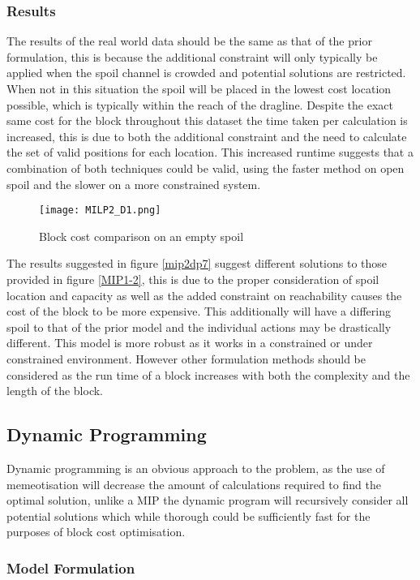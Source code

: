 \subsubsection{Results}
The results of the real world data should be the same as that of the prior formulation, this is because the additional constraint will only typically be applied when the spoil channel is crowded and potential solutions are restricted. When not in this situation the spoil will be placed in the lowest cost location possible, which is typically within the reach of the dragline. Despite the exact same cost for the block throughout this dataset the time taken per calculation is increased, this is due to both the additional constraint and the need to calculate the set of valid positions for each location. This increased runtime suggests that a combination of both techniques could be valid, using the faster method on open spoil and the slower on a more constrained system. 
\begin{figure}[h]
\caption{Block cost comparison on an empty spoil}
\label{MIP-1}
\texttt{[image: MILP2\_D1.png]}
\end{figure}
The results suggested in figure \ref{mip2dp7} suggest different solutions to those provided in figure \ref{MIP1-2}, this is due to the proper consideration of spoil location and capacity as well as the added constraint on reachability causes the cost of the block to be more expensive. This additionally will have a differing spoil to that of the prior model and the individual actions may be drastically different. This model is more robust as it works in a constrained or under constrained environment. However other formulation methods should be considered as the run time of a block increases with both the complexity and the length of the block. 
\subsection{Dynamic Programming}
Dynamic programming is an obvious approach to the problem, as the use of memeotisation will decrease the amount of calculations required to find the optimal solution, unlike a MIP the dynamic program will recursively consider all potential solutions which while thorough could be sufficiently fast for the purposes of block cost optimisation. 
\subsubsection{Model Formulation}
